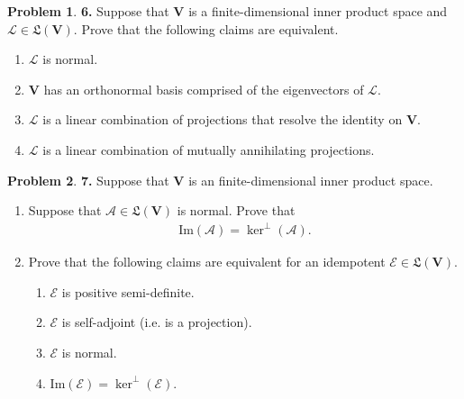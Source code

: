 \documentclass{book}
\theoremstyle{definition}
\newtheorem*{prob*}{Problem}
\newcommand{\V}{\mathbf{V}}
\newcommand{\A}{\mathcal{A}}
\newcommand{\lag}{\mathcal{L}}
\newcommand{\E}{\mathcal{E}}
\newcommand{\ima}{\text{Im}}
\newcommand{\LL}{\mathfrak{L}}
\begin{document}
\newpage




\begin{prob*}\textbf{6.} Suppose that $\V$ is a finite-dimensional inner product space and $\lag \in \LL(\V)$. Prove that the following claims are equivalent.
	\begin{enumerate}
		\item $\lag$ is normal.
		\item $\V$ has an orthonormal basis comprised of the eigenvectors of $\lag$.
		\item $\lag$ is a linear combination of projections that resolve the identity on $\V$.
		\item $\lag$ is a linear combination of mutually annihilating projections.
	\end{enumerate}
	
\end{prob*}




\newpage



\begin{prob*}\textbf{7.} Suppose that $\V$ is an finite-dimensional inner product space. 
	\begin{enumerate}
		\item Suppose that $\A \in \LL(\V)$ is normal. Prove that 
		\begin{align*}
		\ima(\A) = \ker^\perp(\A).
		\end{align*}
		
		\item Prove that the following claims are equivalent for an idempotent $\E \in \LL(\V)$.
		\begin{enumerate}
			\item $\E$ is positive semi-definite.
			\item $\E$ is self-adjoint (i.e. is a projection).
			\item $\E$ is normal.
			\item $\ima(\E) = \ker^\perp(\E)$.
		\end{enumerate}
	\end{enumerate}
	
\end{prob*}


\newpage
\end{document}
